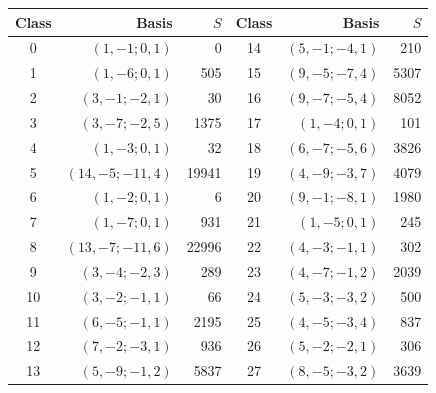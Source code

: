 \begin{center}\small
\begin{tabular}{crr@{\qquad}crr}
\toprule
Class & Basis & \(S\) & Class & Basis & \(S\)\\
\midrule
0 & \((1,-1;0,1)\) & 0 & 14 & \((5,-1;-4,1)\) & 210\\
1 & \((1,-6;0,1)\) & 505 & 15 & \((9,-5;-7,4)\) & 5307\\
2 & \((3,-1;-2,1)\) & 30 & 16 & \((9,-7;-5,4)\) & 8052\\
3 & \((3,-7;-2,5)\) & 1375 & 17 & \((1,-4;0,1)\) & 101\\
4 & \((1,-3;0,1)\) & 32 & 18 & \((6,-7;-5,6)\) & 3826\\
5 & \((14,-5;-11,4)\) & 19941 & 19 & \((4,-9;-3,7)\) & 4079\\
6 & \((1,-2;0,1)\) & 6 & 20 & \((9,-1;-8,1)\) & 1980\\
7 & \((1,-7;0,1)\) & 931 & 21 & \((1,-5;0,1)\) & 245\\
8 & \((13,-7;-11,6)\) & 22996 & 22 & \((4,-3;-1,1)\) & 302\\
9 & \((3,-4;-2,3)\) & 289 & 23 & \((4,-7;-1,2)\) & 2039\\
10 & \((3,-2;-1,1)\) & 66 & 24 & \((5,-3;-3,2)\) & 500\\
11 & \((6,-5;-1,1)\) & 2195 & 25 & \((4,-5;-3,4)\) & 837\\
12 & \((7,-2;-3,1)\) & 936 & 26 & \((5,-2;-2,1)\) & 306\\
13 & \((5,-9;-1,2)\) & 5837 & 27 & \((8,-5;-3,2)\) & 3639\\
\bottomrule
\end{tabular}
\end{center}
